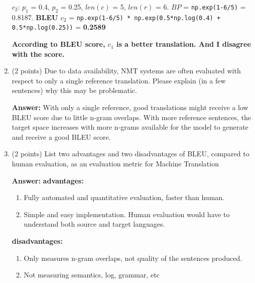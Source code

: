 \documentclass{article}
\begin{document}
\begin{enumerate}[i]
    $c_2$: $p_1$ = 0.4, $p_2$ = 0.25, $len(c)$ = 5, $len(r)$ = 6. $BP$ = \verb|np.exp(1-6/5)| = 0.8187. 
    \newline 
    \textbf{BLEU $c_2$} = \verb|np.exp(1-6/5) * np.exp(0.5*np.log(0.4) + 0.5*np.log(0.25))| = \textbf{0.2589}
    
    \textbf{According to BLEU score, $c_1$ is a better translation. And I disagree with the score.}
    
    \item (2 points)  Due to data availability, NMT systems are often evaluated with respect to only a single reference translation.  Please explain (in a few sentences) why this may be problematic.
    
    \textbf{Answer:} With only a single reference, good translations might receive a low BLEU score due to little n-gram overlaps. With more reference sentences, the target space increases with more n-grams available for the model to generate and receive a good BLEU score.
    
    \item (2 points)  List two advantages and two disadvantages of BLEU, compared to human evaluation, as an evaluation metric for Machine Translation
    
    \textbf{Answer:} \newline \textbf{advantages:} \begin{enumerate}[1]
        \item Fully automated and quantitative evaluation, faster than human.
        \item Simple and easy implementation. Human evaluation would have to understand both source and target languages.
    \end{enumerate}
    \textbf{disadvantages:} 
    \begin{enumerate}[1]
        \item Only measures n-gram overlaps, not quality of the sentences produced.
        \item Not measuring semantics, log, grammar, etc
    \end{enumerate}


\end{enumerate}
\end{document}
